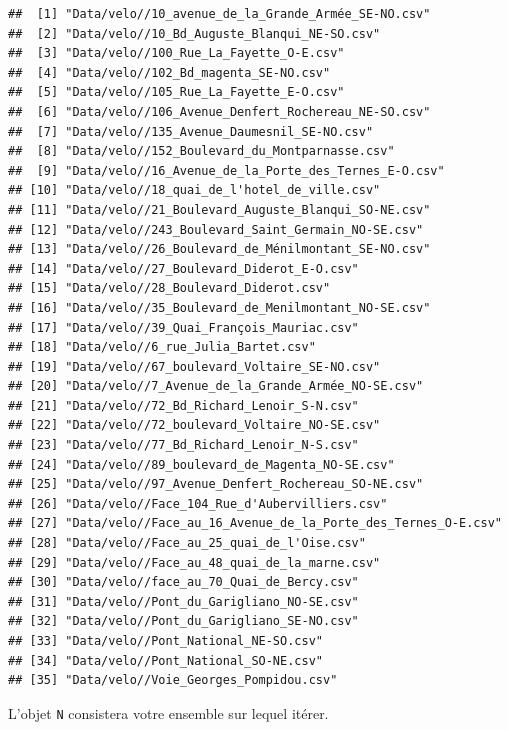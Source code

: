 \documentclass[
  11pt,
]{book}
\newcommand{\VERB}{\Verb[commandchars=\\\{\}]}
\newcommand{\ControlFlowTok}[1]{\textcolor[rgb]{0.13,0.29,0.53}{\textbf{#1}}}
\newcommand{\NormalTok}[1]{#1}
\providecommand{\tightlist}{%
  \setlength{\itemsep}{0pt}\setlength{\parskip}{0pt}}
\numberwithin{equation}{section}
\numberwithin{countremarque}{section}
\newenvironment{greenbox}{
  \begin{tcolorbox}[breakable, colback=vert,coltext=black,
                  colframe=grisfonce]}
 {\end{tcolorbox}}
\begin{document}
\begin{greenbox}
\begin{lstlisting}
##  [1] "Data/velo//10_avenue_de_la_Grande_Armée_SE-NO.csv"          
##  [2] "Data/velo//10_Bd_Auguste_Blanqui_NE-SO.csv"                 
##  [3] "Data/velo//100_Rue_La_Fayette_O-E.csv"                      
##  [4] "Data/velo//102_Bd_magenta_SE-NO.csv"                        
##  [5] "Data/velo//105_Rue_La_Fayette_E-O.csv"                      
##  [6] "Data/velo//106_Avenue_Denfert_Rochereau_NE-SO.csv"          
##  [7] "Data/velo//135_Avenue_Daumesnil_SE-NO.csv"                  
##  [8] "Data/velo//152_Boulevard_du_Montparnasse.csv"               
##  [9] "Data/velo//16_Avenue_de_la_Porte_des_Ternes_E-O.csv"        
## [10] "Data/velo//18_quai_de_l'hotel_de_ville.csv"                 
## [11] "Data/velo//21_Boulevard_Auguste_Blanqui_SO-NE.csv"          
## [12] "Data/velo//243_Boulevard_Saint_Germain_NO-SE.csv"           
## [13] "Data/velo//26_Boulevard_de_Ménilmontant_SE-NO.csv"          
## [14] "Data/velo//27_Boulevard_Diderot_E-O.csv"                    
## [15] "Data/velo//28_Boulevard_Diderot.csv"                        
## [16] "Data/velo//35_Boulevard_de_Menilmontant_NO-SE.csv"          
## [17] "Data/velo//39_Quai_François_Mauriac.csv"                    
## [18] "Data/velo//6_rue_Julia_Bartet.csv"                          
## [19] "Data/velo//67_boulevard_Voltaire_SE-NO.csv"                 
## [20] "Data/velo//7_Avenue_de_la_Grande_Armée_NO-SE.csv"           
## [21] "Data/velo//72_Bd_Richard_Lenoir_S-N.csv"                    
## [22] "Data/velo//72_boulevard_Voltaire_NO-SE.csv"                 
## [23] "Data/velo//77_Bd_Richard_Lenoir_N-S.csv"                    
## [24] "Data/velo//89_boulevard_de_Magenta_NO-SE.csv"               
## [25] "Data/velo//97_Avenue_Denfert_Rochereau_SO-NE.csv"           
## [26] "Data/velo//Face_104_Rue_d'Aubervilliers.csv"                
## [27] "Data/velo//Face_au_16_Avenue_de_la_Porte_des_Ternes_O-E.csv"
## [28] "Data/velo//Face_au_25_quai_de_l'Oise.csv"                   
## [29] "Data/velo//Face_au_48_quai_de_la_marne.csv"                 
## [30] "Data/velo//face_au_70_Quai_de_Bercy.csv"                    
## [31] "Data/velo//Pont_du_Garigliano_NO-SE.csv"                    
## [32] "Data/velo//Pont_du_Garigliano_SE-NO.csv"                    
## [33] "Data/velo//Pont_National_NE-SO.csv"                         
## [34] "Data/velo//Pont_National_SO-NE.csv"                         
## [35] "Data/velo//Voie_Georges_Pompidou.csv"
\end{lstlisting}

L'objet \texttt{N} consistera votre ensemble sur lequel itérer.


\end{greenbox}
\end{document}
